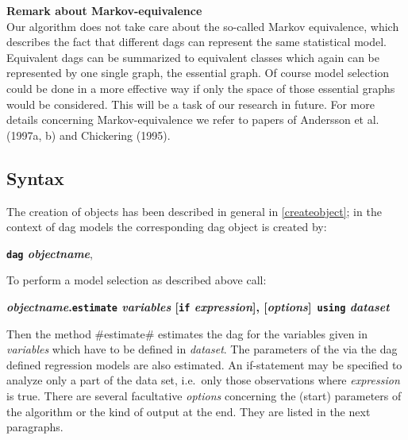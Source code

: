 \bigskip




\bigskip

{\bf Remark about Markov-equivalence} \\[0.2cm]
Our algorithm does not take care about the so-called Markov
equivalence, which describes the fact that different dags can
represent the same statistical model. Equivalent dags can be
summarized to equivalent classes which again can be represented by
one single graph, the essential graph. Of course model selection
could be done in a more effective way if only the space of those
essential graphs would be considered. This will be a task of our
research in future. For more details concerning Markov-equivalence
we refer to papers of Andersson et al. (1997a, b) and Chickering
(1995).





\subsection{Syntax}
%
 
%
The creation of objects has been described in general in
\autoref{createobject}; in the context of dag models the
corresponding dag object is created by:

\begin{center}
{\bf \texttt{dag} {\em objectname}},\\
\end{center}

To perform a model selection as described above call:

\begin{center}
{\bf {\em objectname}.\texttt{estimate} {\em variables}
[\texttt{if} {\em expression}], [{\em options}]\texttt{ using}
{\em dataset} }
\bigskip
\end{center}

Then the method #estimate# estimates the dag for the variables
given in {\it variables} which have to be defined in {\it
dataset}. The parameters of the via the dag defined regression
models are also estimated. An if-statement may be specified to
analyze only a part of the data set, i.e.~only those observations
where {\it expression} is true. There are several facultative {\it
options} concerning the (start) parameters of the algorithm or the
kind of output at the end. They are listed in the next paragraphs.

